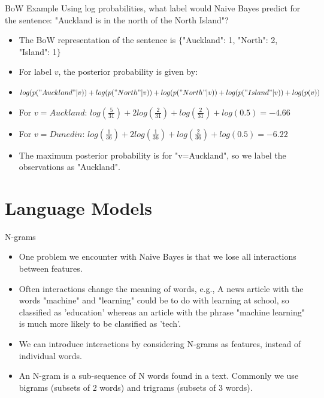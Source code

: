 \documentclass[aspectratio=169, 10pt]{beamer}
\begin{document}
\begin{frame}{BoW Example}
    Using log probabilities, what label would Naive Bayes predict for the sentence: "Auckland is in the north of the North Island"?
    \pause
    \begin{itemize}
        \item The BoW representation of the sentence is $\{$"Auckland": 1, "North": 2, "Island": 1$\}$
        \item For label $v$, the posterior probability is given by:
        \item $log(p("Auckland"|v)) + log(p("North"|v)) + log(p("North"|v)) + log(p("Island"|v)) + log(p(v))$
        \pause
        \item For $v=Auckland$: $log(\frac{5}{31}) + 2log(\frac{2}{31}) + log(\frac{2}{31}) + log(0.5) = -4.66$
        \item For $v=Dunedin$: $log(\frac{1}{36}) + 2log(\frac{1}{36}) + log(\frac{2}{36}) + log(0.5) = -6.22$
        \item The maximum posterior probability is for "v=Auckland", so we label the observations as "Auckland".
    \end{itemize}
\end{frame}
    
\section{Language Models}
\begin{frame}{N-grams}
\begin{itemize}
    \item One problem we encounter with Naive Bayes is that we lose all interactions between features.
    \item Often interactions change the meaning of words, e.g., A news article with the words "machine" and "learning" could be to do with learning at school, so classified as 'education' whereas an article with the phrase "machine learning" is much more likely to be classified as 'tech'.
    \item We can introduce interactions by considering N-grams as features, instead of individual words.
    \item An N-gram is a sub-sequence of N words found in a text. Commonly we use bigrams (subsets of 2 words) and trigrams (subsets of 3 words).
\end{itemize}
\end{frame}
\end{document}
